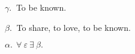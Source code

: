 

$\gamma.\ $ To be known.

$\beta.\ $ To share, to love, to be known.

$\alpha.\ \ \forall\ \varepsilon\ \exists\ \beta . $ 

\bye
